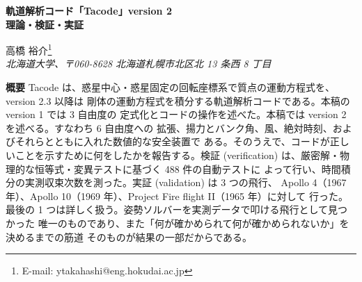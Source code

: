 \documentclass[11pt,a4paper,dvipdfmx]{jsarticle}
\begin{document}
\begin{center}
{\LARGE \bf 軌道解析コード「Tacode」version 2 \\[3mm]
理論・検証・実証}
\end{center}

\begin{center}
{\normalsize
  高橋 裕介\footnote{E-mail: ytakahashi@eng.hokudai.ac.jp} \\
  {\itshape 北海道大学、〒060-8628 北海道札幌市北区北 13 条西 8 丁目}
}
\end{center}

\vspace{3mm}
\noindent
{\small
{\bf 概要}\quad
Tacode は、惑星中心・惑星固定の回転座標系で質点の運動方程式を、version 2.3 以降は
剛体の運動方程式を積分する軌道解析コードである。本稿の version 1 では 3 自由度の
定式化とコードの操作を述べた。本稿では version 2 を述べる。すなわち 6 自由度への
拡張、揚力とバンク角、風、絶対時刻、およびそれらとともに入れた数値的な安全装置で
ある。そのうえで、コードが正しいことを示すために何をしたかを報告する。検証
(verification) は、厳密解・物理的な恒等式・変異テストに基づく 488 件の自動テストに
よって行い、時間積分の実測収束次数を測った。実証 (validation) は 3 つの飛行、
Apollo 4（1967 年）、Apollo 10（1969 年）、Project Fire flight II（1965 年）に対して
行った。最後の 1 つは詳しく扱う。姿勢ソルバーを実測データで叩ける飛行として見つかった
唯一のものであり、また「何が確かめられて何が確かめられないか」を決めるまでの筋道
そのものが結果の一部だからである。
}

\end{document}
